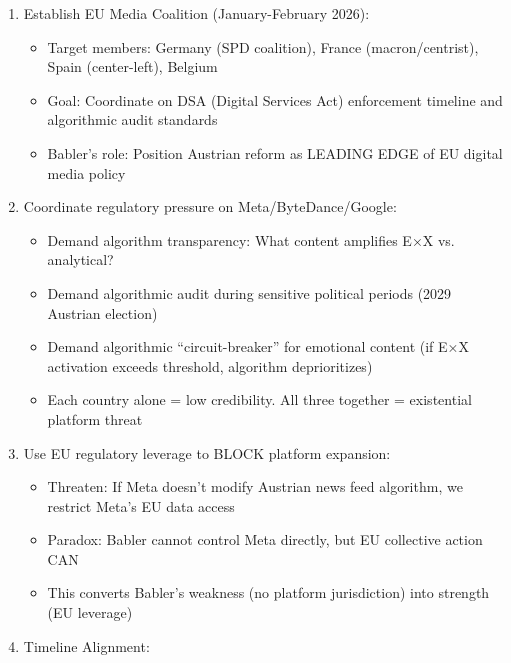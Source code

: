 \begin{enumerate}
\item Establish EU Media Coalition (January-February 2026):

  \begin{itemize}
  \item Target members: Germany (SPD coalition), France (macron/centrist), Spain (center-left), Belgium
  \item Goal: Coordinate on DSA (Digital Services Act) enforcement timeline and algorithmic audit standards
  \item Babler's role: Position Austrian reform as LEADING EDGE of EU digital media policy
  \end{itemize}

\item Coordinate regulatory pressure on Meta/ByteDance/Google:

  \begin{itemize}
  \item Demand algorithm transparency: What content amplifies E×X vs. analytical?
  \item Demand algorithmic audit during sensitive political periods (2029 Austrian election)
  \item Demand algorithmic ``circuit-breaker'' for emotional content (if E×X activation exceeds threshold, algorithm deprioritizes)
  \item Each country alone = low credibility. All three together = existential platform threat
  \end{itemize}

\item Use EU regulatory leverage to BLOCK platform expansion:

  \begin{itemize}
  \item Threaten: If Meta doesn't modify Austrian news feed algorithm, we restrict Meta's EU data access
  \item Paradox: Babler cannot control Meta directly, but EU collective action CAN
  \item This converts Babler's weakness (no platform jurisdiction) into strength (EU leverage)
  \end{itemize}

\item Timeline Alignment:


\end{enumerate}
